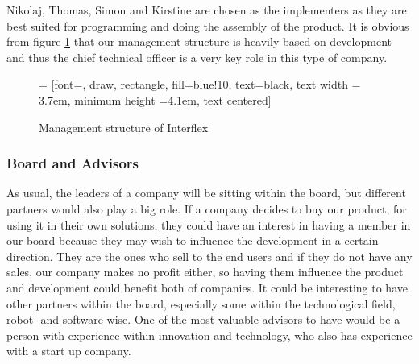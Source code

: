 Nikolaj, Thomas, Simon and Kirstine are chosen as the implementers as they are best suited for programming and doing the assembly of the product.
It is obvious from figure \ref{management_structure} that our management structure is heavily based on development and thus the chief technical officer is a very key role in this type of company.

\begin{figure}[ht]
\centering
     = [font=\footnotesize, draw, rectangle, fill=blue!10, text=black, text width = 3.7em, minimum height =4.1em, text centered]
  \caption{Management structure of Interflex}
  \label{management_structure}
\end{figure}


\subsubsection{Board and Advisors}
As usual, the leaders of a company will be sitting within the board, but different partners would also play a big role. 
If a company decides to buy our product, for using it in their own solutions, they could have an interest in having a member in our board because they may wish to influence the development in a certain direction. 
They are the ones who sell to the end users and if they do not have any sales, our company makes no profit either, so having them influence the product and development could benefit both of companies. 
It could be interesting to have other partners within the board, especially some within the technological field, robot- and software wise.
One of the most valuable advisors to have would be a person with experience within innovation and technology, who also has experience with a start up company. 

